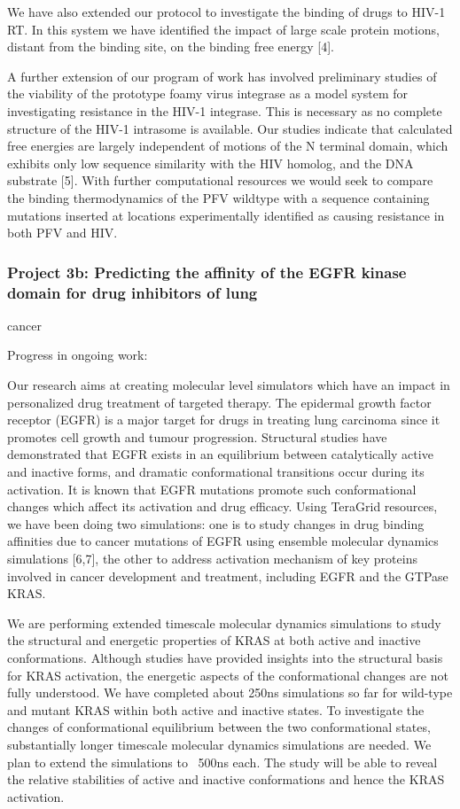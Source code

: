\documentclass[a4paper,10pt]{article}
\begin{document}
We have also extended our protocol to investigate the binding of drugs to HIV-1 RT. In this system we have identified the impact of large scale protein motions, distant from the binding site, on the binding free energy [4].

A further extension of our program of work has involved preliminary studies of the viability of the prototype foamy virus integrase as a model system for investigating resistance in the HIV-1 integrase. This is necessary as no complete structure of the HIV-1 intrasome is available. Our studies indicate that calculated free energies are largely independent of motions of the N terminal domain, which exhibits only low sequence similarity with the HIV homolog, and the DNA substrate [5]. With further computational resources we would seek to compare the binding thermodynamics of the PFV wildtype with a sequence containing mutations inserted at locations experimentally identified as causing resistance in both PFV and HIV.

\subsubsection{Project 3b: Predicting the affinity of the EGFR kinase domain for drug inhibitors of lung}
cancer

Progress in ongoing work:

Our research aims at creating molecular level simulators which have an impact in personalized drug treatment of targeted therapy. The epidermal growth factor receptor (EGFR) is a major target for drugs in treating lung carcinoma since it promotes cell growth and tumour progression. Structural studies have demonstrated that EGFR exists in an equilibrium between catalytically active and inactive forms, and dramatic conformational transitions occur during its activation. It is known that EGFR mutations promote such conformational changes which affect its activation and drug efficacy. Using TeraGrid resources, we have been doing two simulations: one is to study changes in drug binding affinities due to cancer mutations of EGFR using ensemble molecular dynamics simulations [6,7], the other to address activation mechanism of key proteins involved in cancer development and treatment, including EGFR and the GTPase KRAS.

We are performing extended timescale molecular dynamics simulations to study the structural and energetic properties of KRAS at both active and inactive conformations. Although studies have provided insights into the structural basis for KRAS activation, the energetic aspects of the conformational changes are not fully understood. We have completed about 250ns simulations so far for wild-type and mutant KRAS within both active and inactive states. To investigate the changes of conformational equilibrium between the two conformational states, substantially longer timescale molecular dynamics simulations are needed. We plan to extend the simulations to ~500ns each. The study will be able to reveal the relative stabilities of active and inactive conformations and hence the KRAS activation.
\end{document}
